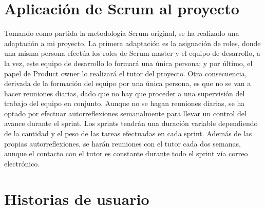 \begin{table}[h]
\centering
{}
\caption{Comparativa de las metodologías de desarrollo}
\end{table}

\section{Aplicación de Scrum al proyecto} \label{sec:apli_scrum}

Tomando como partida la metodología Scrum original, se ha realizado una adaptación a mi proyecto. La primera adaptación es la asignación de roles, donde una misma persona efectúa los roles de Scrum master y el equipo de desarrollo, a la vez, este equipo de desarrollo lo formará una única persona; y por último, el papel de Product owner lo realizará el tutor del proyecto. Otra consecuencia, derivada de la formación del equipo por una única persona, es que no se van a hacer reuniones diarias, dado que no hay que proceder a una supervisión del trabajo del equipo en conjunto. Aunque no se hagan reuniones diarias, se ha optado por efectuar autorreflexiones semanalmente para llevar un control del avance durante el sprint. Los sprints tendrán una duración variable dependiendo de la cantidad y el peso de las tareas efectuadas en cada sprint. Además de las propias autorreflexiones, se harán reuniones con el tutor cada dos semanas, aunque el contacto con el tutor es constante durante todo el sprint vía correo electrónico.

\section{Historias de usuario}


